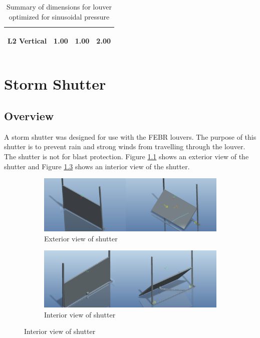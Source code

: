\documentclass[12pt,letterpaper]{report}
\begin{document}
\begin{table}[H]
\begin{tabular}{|c|c|c|c|}
			\hline L2 Vertical  & 1.00 & \begin{small}
			1.00
			\end{small} & \begin{small}
			2.00
			\end{small}\\
			
			\hline
			\end{tabular}
			\caption{Summary of dimensions for louver optimized for sinusoidal pressure}
			\label{tab:SinusoidDims}
		\end{table}
		
		\chapter{Storm Shutter}
		\vspace{-.25in}
		\section{Overview}
		A storm shutter was designed for use with the FEBR louvers.  The purpose of this shutter is to prevent rain and strong winds from travelling through the louver.  The shutter is not for blast protection.  Figure \ref{fig:ShutterExterior} shows an exterior view of the shutter and Figure \ref{fig:ShutterInterior} shows an interior view of the shutter.
		
		\graphicspath{ {./ScreenShots/Shutter/} }
		\begin{figure}[H]
			\centering
			\begin{subfigure}{.9\textwidth}
				\includegraphics[width=\textwidth]{ShutterExterior}
				\caption{Exterior view of shutter}
				\label{fig:ShutterExterior}
			\end{subfigure}
			\begin{subfigure}{.9\textwidth}
				\includegraphics[width=\textwidth]{ShutterInterior}
				\caption{Interior view of shutter}
				\label{fig:ShutterInterior}
			\end{subfigure}
		\end{figure}
		
\end{document}

